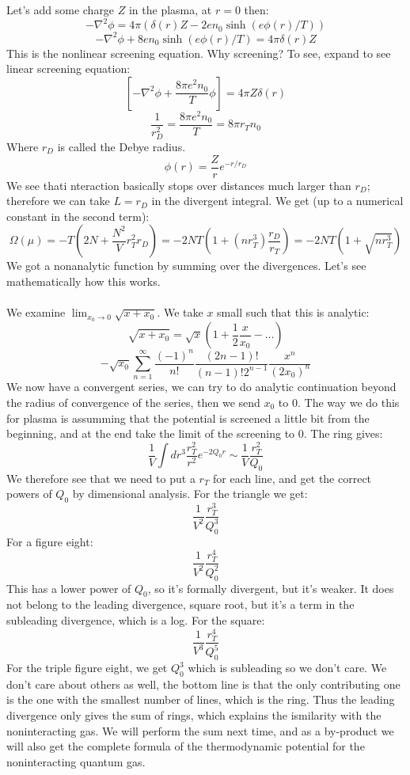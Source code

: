 \documentclass[12 pt]{article}
\begin{document}
Let's add some charge $Z$ in the plasma, at $r=0$ then:
\[    - \nabla^2 \phi = 4\pi \left( \delta(r) Z - 2en_0 \sinh(e\phi(r)/T)  \right)    \]
\[       - \nabla^2 \phi + 8en_0  \sinh(e\phi(r)/T) = 4\pi \delta(r) Z    \]
This is the nonlinear screening equation. Why screening? To see, expand to see linear screening equation:
\[    \left[ - \nabla^2 \phi + \frac{8\pi e^2 n_0}{T} \phi  \right] = 4\pi Z \delta(r)  \]
\[     \frac{1}{r_D^2} = \frac{8\pi e^2 n_0}{T} = 8\pi r_T n_0  \]
Where $r_D$ is called the Debye radius. 
\[    \phi(r) = \frac{Z}{r} e^{- r/r_D}      \]
We see thati nteraction basically stops over distances much larger than $r_D$; therefore we can take $L = r_D$ in the divergent integral. We get (up to a numerical constant in the second term):
\[      \Omega(\mu) = - T \left(  2N + \frac{N^2}{V} r_T^2 r_D \right)  = - 2NT \left( 1 + (n r_T^3) \frac{r_D}{r_T}  \right)  = -2NT(1 + \sqrt{nr_T^3})    \]
We got a nonanalytic function by summing over the divergences. Let's see mathematically how this works.
\\
\\
We examine $\lim_{x_0 \to 0} \sqrt{x + x_0}$. We take $x$ small such that this is analytic:
\[    \sqrt{x + x_0}  = \sqrt{x} \left( 1 + \frac{1}{2} \frac{x}{x_0} - \dots  \right)   \]
\[     - \sqrt{x_0} \sum_{n=1}^{\infty} \frac{(-1)^n}{n!} \frac{(2n-1)!}{(n-1)! 2^{n-1}} \frac{x^n}{(2x_0)^n}      \]
We now have a convergent series, we can try to do analytic continuation beyond the radius of convergence of the series, then we send $x_0$ to 0. The way we do this for plasma is assumming that the potential is screened a little bit from the beginning, and at the end take the limit of the screening to 0. The ring gives:
\[       \frac{1}{V} \int dr^3 \frac{r_T^2}{r^2} e^{-2Q_0 r}  \sim \frac{1}{V} \frac{r_T^2}{Q_0}   \]
We therefore see that we need to put a $r_T$ for each line, and get the correct powers of $Q_0$ by dimensional analysis. For the triangle we get:
\[     \frac{1}{V^2} \frac{r_T^3}{Q_0^3}    \]
For a figure eight:
\[         \frac{1}{V^2} \frac{r_T^4}{Q_0^2}      \]
This has a lower power of $Q_0$, so it's formally divergent, but it's weaker. It does not belong to the leading divergence, square root, but it's a term in the subleading divergence, which is a log. For the square:
\[   \frac{1}{V^3} \frac{r_T^4}{Q_0^5}    \]
For the triple figure eight, we get $Q_0^3$ which is subleading so we don't care. We don't care about others as well, the bottom line is that the only contributing one is the one with the smallest number of lines, which is the ring. Thus the leading divergence only gives the sum of rings, which explains the ismilarity with the noninteracting gas. We will perform the sum next time, and as a by-product we will also get the complete formula of the thermodynamic potential for the noninteracting quantum gas.
\end{document}
